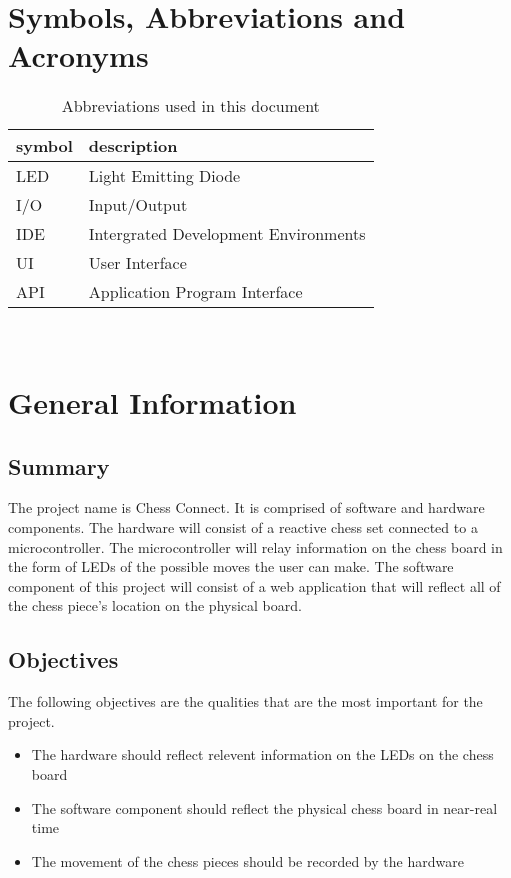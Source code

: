 \documentclass[12pt, titlepage]{article}
\begin{document}
\newpage

\tableofcontents

\newpage

\section{Symbols, Abbreviations and Acronyms}

\renewcommand{\arraystretch}{1.2}
\begin{table}[hp]
  \caption{Abbreviations used in this document}
  \begin{tabular}{l l} 
    \toprule		
    \textbf{symbol} & \textbf{description}\\
    \midrule 
    LED & Light Emitting Diode\\
    I/O & Input/Output\\
    IDE & Intergrated Development Environments\\
    UI & User Interface\\
    API & Application Program Interface\\
    \bottomrule
  \end{tabular}\\
\end{table}

\newpage


\section{General Information}

\subsection{Summary}
The project name is Chess Connect. It is comprised of software and hardware components. The hardware will consist of a reactive chess set 
connected to a microcontroller. The microcontroller will relay information on the chess board in the form of LEDs of the possible moves the user can make.
The software component of this project will consist of a web application that will reflect all of the chess piece's location on the physical board.

\subsection{Objectives}
The following objectives are the qualities that are the most important for the project.
\begin{itemize}
  \item The hardware should reflect relevent information on the LEDs on the chess board
  \item The software component should reflect the physical chess board in near-real time
  \item The movement of the chess pieces should be recorded by the hardware
\end{itemize}
\end{document}
